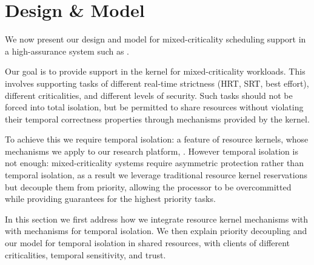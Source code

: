 \chapter{Design \& Model}
\label{chap:model}

We now present our design and model for mixed-criticality scheduling support in a high-assurance
system such as \selfour. 

Our goal is to provide support in the kernel for mixed-criticality workloads.  This involves
supporting tasks of different real-time strictness (\gls{HRT}, \gls{SRT}, best effort), different
criticalities, and different levels of security.  Such tasks should not be forced into total
isolation, but be permitted to share resources without violating their temporal correctness
properties through mechanisms provided by the kernel.

To achieve this we require temporal isolation: a feature of resource kernels, whose mechanisms we
apply to our research platform, \selfour.  However temporal isolation is not enough: mixed-criticality
systems require asymmetric protection rather than temporal isolation, as a result we leverage
traditional resource kernel reservations but decouple them from priority, allowing the processor to
be overcommitted while providing guarantees for the highest priority tasks.

In this section we first address how we integrate resource kernel mechanisms with \selfour with
mechanisms for temporal isolation. We then explain
priority decoupling and our model for temporal isolation in shared resources, with clients of
different criticalities, temporal sensitivity, and trust.

